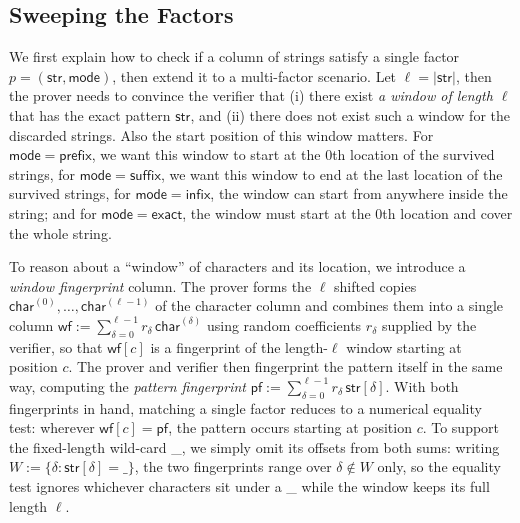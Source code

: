 \subsection{Sweeping the Factors}
\label{sec:sweeping-factors}

 We first explain how to check if a column of strings satisfy a single factor $p=(\mathsf{str},\mathsf{mode})$, then extend it to a multi-factor scenario. Let $\ell=|\mathsf{str}|$, then the prover needs to convince the verifier that (i) there exist \emph{a window of length $\ell$} that has the exact pattern $\mathsf{str}$, and (ii) there does not exist such a window for the discarded strings. Also the start position of this window matters. For $\mathsf{mode}=\mathsf{prefix}$, we want this window to start at the 0th location of the survived strings, for $\mathsf{mode}=\mathsf{suffix}$, we want this window to end at the last location of the survived strings, for $\mathsf{mode}=\mathsf{infix}$, the window can start from anywhere inside the string; and for $\mathsf{mode}=\mathsf{exact}$, the window must start at the 0th location and cover the whole string.

To reason about a ``window'' of characters and its location, we introduce a \emph{window fingerprint} column. The prover forms the $\ell$ shifted copies $\mathsf{char}^{(0)},\dots,\mathsf{char}^{(\ell-1)}$ of the character column and combines them into a single column $\mathsf{wf}:=\sum_{\delta=0}^{\ell-1}r_\delta\,\mathsf{char}^{(\delta)}$ using random coefficients $r_\delta$ supplied by the verifier, so that $\mathsf{wf}[c]$ is a fingerprint of the length-$\ell$ window starting at position $c$. The prover and verifier then fingerprint the pattern itself in the same way, computing the \emph{pattern fingerprint} $\mathsf{pf}:=\sum_{\delta=0}^{\ell-1}r_\delta\,\mathsf{str}[\delta]$. With both fingerprints in hand, matching a single factor reduces to a numerical equality test: wherever $\mathsf{wf}[c]=\mathsf{pf}$, the pattern occurs starting at position $c$. To support the fixed-length wild-card \_, we simply omit its offsets from both sums: writing $W:=\{\delta:\mathsf{str}[\delta]=\text{\_}\}$, the two fingerprints range over $\delta\notin W$ only, so the equality test ignores whichever characters sit under a \_ while the window keeps its full length $\ell$.

